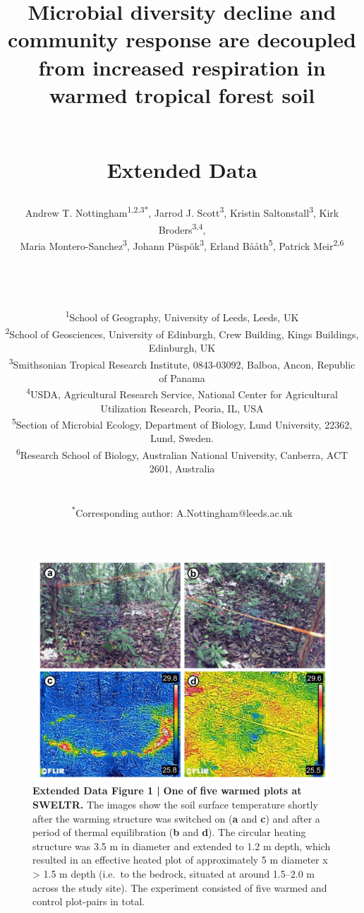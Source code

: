 \documentclass[
  letterpaper,
  DIV=11,
  numbers=noendperiod]{scrartcl}
\date{}
\title{\LARGE Microbial diversity decline and community response are
decoupled from increased respiration in warmed tropical forest soil\\
\strut \\
Extended Data}
\author{Andrew T. Nottingham\textsuperscript{1,2,3*}, Jarrod J.
Scott\textsuperscript{3}, Kristin Saltonstall\textsuperscript{3}, Kirk
Broders\textsuperscript{3,4},\\
Maria Montero-Sanchez\textsuperscript{3}, Johann
Püspök\textsuperscript{3}, Erland Bååth\textsuperscript{5}, Patrick
Meir\textsuperscript{2,6}\\
\strut \\
\strut \\
\RaggedRight \small \textsuperscript{1}School of Geography, University
of Leeds, Leeds, UK\\
\small \textsuperscript{2}School of Geosciences, University of
Edinburgh, Crew Building, Kings Buildings, Edinburgh, UK\\
\small \textsuperscript{3}Smithsonian Tropical Research Institute,
0843-03092, Balboa, Ancon, Republic of Panama\\
\small \textsuperscript{4}USDA, Agricultural Research Service, National
Center for Agricultural Utilization Research, Peoria, IL, USA\\
\small \textsuperscript{5}Section of Microbial Ecology, Department of
Biology, Lund University, 22362, Lund, Sweden.\\
\small \textsuperscript{6}Research School of Biology, Australian
National University, Canberra, ACT 2601, Australia\\
\strut \\
\small \textsuperscript{*}Corresponding author:
A.Nottingham@leeds.ac.uk}
\date{}
\begin{document}
\maketitle
\ifdefined\Shaded\renewenvironment{Shaded}{\begin{tcolorbox}[interior hidden, frame hidden, sharp corners, boxrule=0pt, breakable, borderline west={3pt}{0pt}{shadecolor}, enhanced]}{\end{tcolorbox}}\fi

\begin{figure}

{\centering \includegraphics[width=1\textwidth,height=\textheight]{FIGURES/Extended_Data_Fig_1.png}

}

\caption{\textbf{Extended Data Figure 1 |}
\textbf{One of five warmed plots at SWELTR.} The images show the soil
surface temperature shortly after the warming structure was switched on
(\textbf{a} and \textbf{c}) and after a period of thermal equilibration
(\textbf{b} and \textbf{d}). The circular heating structure was 3.5 m in
diameter and extended to 1.2 m depth, which resulted in an effective
heated plot of approximately 5 m diameter x \textgreater{} 1.5 m depth
(i.e.~to the bedrock, situated at around 1.5--2.0 m across the study
site). The experiment consisted of five warmed and control plot-pairs in
total.}

\end{figure}
\end{document}
